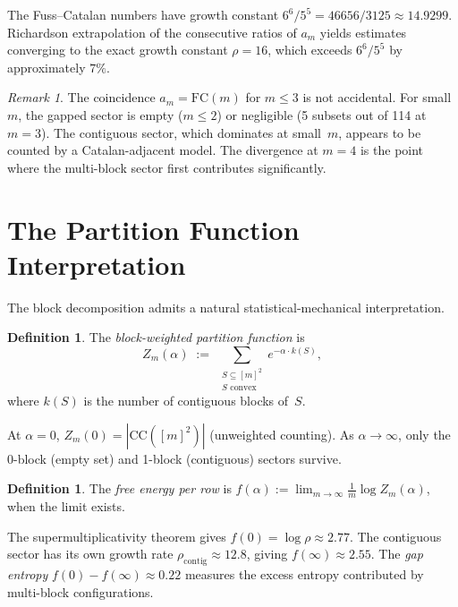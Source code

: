 \documentclass[11pt,a4paper]{article}
\theoremstyle{plain}
\theoremstyle{definition}
\newtheorem{definition}[theorem]{Definition}
\theoremstyle{remark}
\newtheorem{remark}[theorem]{Remark}
\newcommand{\CC}{\mathrm{CC}}
\begin{document}
The Fuss--Catalan numbers have growth constant $6^6/5^5 = 46656/3125 \approx 14.9299$.
Richardson extrapolation of the consecutive ratios of $a_m$ yields estimates converging to the exact growth constant $\rho = 16$, which exceeds $6^6/5^5$ by approximately $7\%$.

\begin{remark}
The coincidence $a_m = \mathrm{FC}(m)$ for $m \leq 3$ is not accidental.
For small~$m$, the gapped sector is empty ($m \leq 2$) or negligible (5 subsets out of 114 at $m = 3$).
The contiguous sector, which dominates at small~$m$, appears to be counted by a Catalan-adjacent model.
The divergence at $m = 4$ is the point where the multi-block sector first contributes significantly.
\end{remark}


\section{The Partition Function Interpretation}\label{sec:partition}

The block decomposition admits a natural statistical-mechanical interpretation.

\begin{definition}
The \emph{block-weighted partition function} is
\[
Z_m(\alpha) \;:=\; \sum_{\substack{S \subseteq [m]^2 \\ S \text{ convex}}} e^{-\alpha \cdot k(S)},
\]
where $k(S)$ is the number of contiguous blocks of~$S$.
\end{definition}

At $\alpha = 0$, $Z_m(0) = |\CC([m]^2)|$ (unweighted counting).
As $\alpha \to \infty$, only the 0-block (empty set) and 1-block (contiguous) sectors survive.

\begin{definition}
The \emph{free energy per row} is $f(\alpha) := \lim_{m \to \infty} \frac{1}{m} \log Z_m(\alpha)$, when the limit exists.
\end{definition}

The supermultiplicativity theorem gives $f(0) = \log \rho \approx 2.77$.
The contiguous sector has its own growth rate $\rho_{\mathrm{contig}} \approx 12.8$, giving $f(\infty) \approx 2.55$.
The \emph{gap entropy} $f(0) - f(\infty) \approx 0.22$ measures the excess entropy contributed by multi-block configurations.
\end{document}
